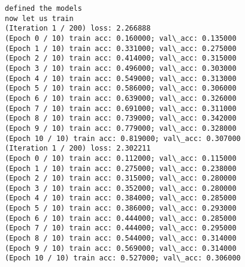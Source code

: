 \documentclass[11pt]{article}
\begin{document}
    \begin{Verbatim}[commandchars=\\\{\}]
defined the models
now let us train
(Iteration 1 / 200) loss: 2.266888
(Epoch 0 / 10) train acc: 0.160000; val\_acc: 0.135000
(Epoch 1 / 10) train acc: 0.331000; val\_acc: 0.275000
(Epoch 2 / 10) train acc: 0.414000; val\_acc: 0.315000
(Epoch 3 / 10) train acc: 0.496000; val\_acc: 0.303000
(Epoch 4 / 10) train acc: 0.549000; val\_acc: 0.313000
(Epoch 5 / 10) train acc: 0.586000; val\_acc: 0.306000
(Epoch 6 / 10) train acc: 0.639000; val\_acc: 0.326000
(Epoch 7 / 10) train acc: 0.691000; val\_acc: 0.311000
(Epoch 8 / 10) train acc: 0.739000; val\_acc: 0.342000
(Epoch 9 / 10) train acc: 0.779000; val\_acc: 0.328000
(Epoch 10 / 10) train acc: 0.819000; val\_acc: 0.307000
(Iteration 1 / 200) loss: 2.302211
(Epoch 0 / 10) train acc: 0.112000; val\_acc: 0.115000
(Epoch 1 / 10) train acc: 0.275000; val\_acc: 0.238000
(Epoch 2 / 10) train acc: 0.315000; val\_acc: 0.280000
(Epoch 3 / 10) train acc: 0.352000; val\_acc: 0.280000
(Epoch 4 / 10) train acc: 0.384000; val\_acc: 0.285000
(Epoch 5 / 10) train acc: 0.386000; val\_acc: 0.293000
(Epoch 6 / 10) train acc: 0.444000; val\_acc: 0.285000
(Epoch 7 / 10) train acc: 0.444000; val\_acc: 0.295000
(Epoch 8 / 10) train acc: 0.544000; val\_acc: 0.314000
(Epoch 9 / 10) train acc: 0.569000; val\_acc: 0.314000
(Epoch 10 / 10) train acc: 0.527000; val\_acc: 0.306000

    \end{Verbatim}
\end{document}
